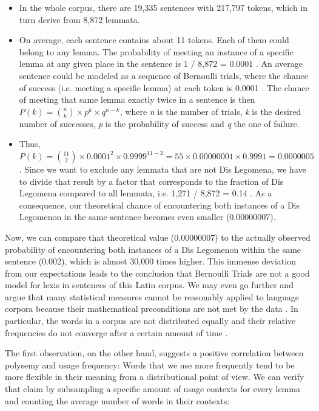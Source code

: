\documentclass[runningheads]{llncs}
\begin{document}
\begin{itemize}
	\item In the whole corpus, there are 19,335 sentences with 217,797 tokens, which in turn derive from 8,872 lemmata.
	\item On average, each sentence contains about 11 tokens. Each of them could belong to any lemma. The probability of meeting an instance of a specific lemma at any given place in the sentence is 1 / 8,872 = 0.0001 . An average sentence could be modeled as a sequence of Bernoulli trials, where the chance of success (i.e. meeting a specific lemma) at each token is 0.0001 . The chance of meeting that same lemma exactly twice in a sentence is then \( P(k) = \binom{n}{k} \times p^k \times q^{n-k} \), where \textit{n} is the number of trials, \textit{k} is the desired number of successes, \textit{p} is the probability of success and \textit{q} the one of failure.
	\item Thus, \( P(k) = \binom{11}{2} \times 0.0001^2 \times 0.9999^{11-2} = 55 \times 0.00000001 \times  0.9991 = 0.0000005 \). Since we want to exclude any lemmata that are not Dis Legomena, we have to divide that result by a factor that corresponds to the fraction of Dis Legomena compared to all lemmata, i.e. 1,271 / 8,872 = 0.14 . As a consequence, our theoretical chance of encountering both instances of a Dis Legomenon in the same sentence becomes even smaller (0.00000007).
\end{itemize}

Now, we can compare that theoretical value (0.00000007) to the actually observed probability of encountering both instances of a Dis Legomenon within the same sentence (0.002), which is almost 30,000 times higher. This immense deviation from our expectations leads to the conclusion that Bernoulli Trials are not a good model for lexis in sentences of this Latin corpus. We may even go further and argue that many statistical measures cannot be reasonably applied to language corpora because their mathematical preconditions are not met by the data \parencite[110]{shadrovaMeasuringCoselectionalConstraint2020}. In particular, the words in a corpus are not distributed equally and their relative frequencies do not converge after a certain amount of time \parencite[5]{debowskiNaturalLanguagePerigraphic2018}.

The first observation, on the other hand, suggests a positive correlation between polysemy and usage frequency: Words that we use more frequently tend to be more flexible in their meaning from a distributional point of view. We can verify that claim by subsampling a specific amount of usage contexts for every lemma and counting the average number of words in their contexts:
\end{document}
